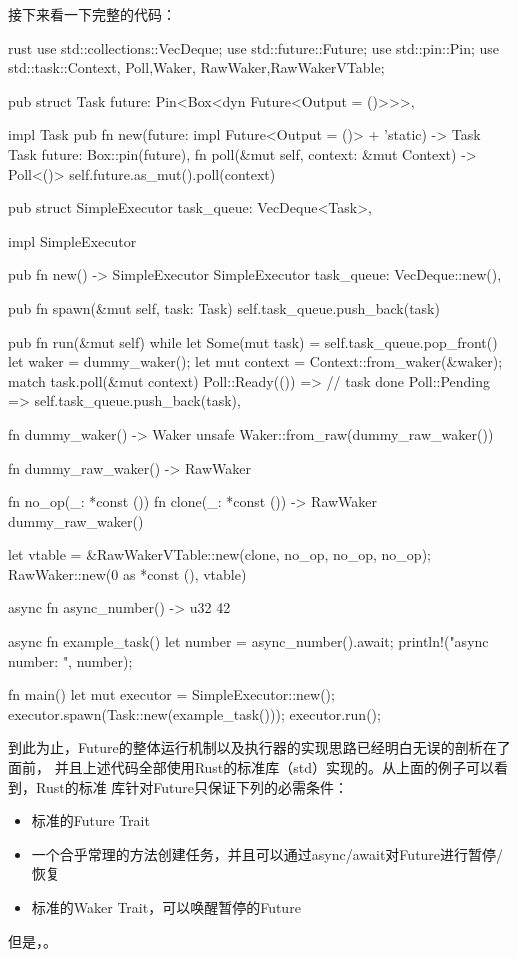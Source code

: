 接下来看一下完整的代码：
\begin{code-block}{rust}
use std::collections::VecDeque;
use std::future::Future;
use std::pin::Pin;
use std::task::{Context, Poll,Waker, RawWaker,RawWakerVTable};

pub struct Task {
    future: Pin<Box<dyn Future<Output = ()>>>,
}

impl Task {
    pub fn new(future: impl Future<Output = ()> + 'static) -> Task {
        Task {
            future: Box::pin(future),
        }
    }
    fn poll(&mut self, context: &mut Context) -> Poll<()> {
        self.future.as_mut().poll(context)
    }
}

pub struct SimpleExecutor {
    task_queue: VecDeque<Task>,
}

impl SimpleExecutor {
    pub fn new() -> SimpleExecutor {
        SimpleExecutor {
            task_queue: VecDeque::new(),
        }
    }

    pub fn spawn(&mut self, task: Task) {
        self.task_queue.push_back(task)
    }

    pub fn run(&mut self) {
        while let Some(mut task) = self.task_queue.pop_front() {
            let waker = dummy_waker();
            let mut context = Context::from_waker(&waker);
            match task.poll(&mut context) {
                Poll::Ready(()) => {} // task done
                Poll::Pending => self.task_queue.push_back(task),
            }
        }
    }
}

fn dummy_waker() -> Waker {
    unsafe { Waker::from_raw(dummy_raw_waker()) }
}

fn dummy_raw_waker() -> RawWaker {
    fn no_op(_: *const ()) {}
    fn clone(_: *const ()) -> RawWaker {
        dummy_raw_waker()
    }

    let vtable = &RawWakerVTable::new(clone, no_op, no_op, no_op);
    RawWaker::new(0 as *const (), vtable)
}

async fn async_number() -> u32 {
    42
}

async fn example_task() {
    let number = async_number().await;
    println!("async number: {}", number);
}

fn main() {
    let mut executor = SimpleExecutor::new();
    executor.spawn(Task::new(example_task()));
    executor.run();
}
\end{code-block}

到此为止，Future的整体运行机制以及执行器的实现思路已经明白无误的剖析在了面前，
并且上述代码全部使用Rust的标准库（std）实现的。从上面的例子可以看到，Rust的标准
库针对Future只保证下列的必需条件：
\begin{itemize}
  \item 标准的Future Trait
  \item 一个合乎常理的方法创建任务，并且可以通过async/await对Future进行暂停/恢复
  \item 标准的Waker Trait，可以唤醒暂停的Future
\end{itemize}
但是，。

